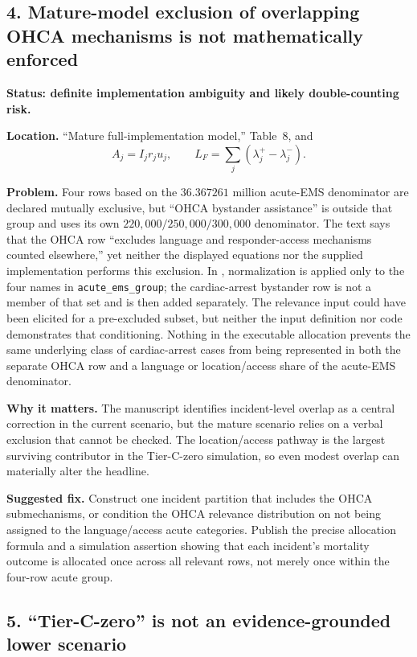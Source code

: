 \documentclass[11pt]{article}
\begin{document}
\subsection*{4. Mature-model exclusion of overlapping OHCA mechanisms is not
mathematically enforced}

\textbf{Status: definite implementation ambiguity and likely double-counting
risk.}

\textbf{Location.} ``Mature full-implementation model,'' Table~8, and
\[
A_j=I_jr_ju_j,\qquad
L_F=\sum_j(\lambda_j^+-\lambda_j^-).
\]

\textbf{Problem.} Four rows based on the $36.367261$ million acute-EMS
denominator are declared mutually exclusive, but ``OHCA bystander assistance''
is outside that group and uses its own $220{,}000/250{,}000/300{,}000$
denominator.  The text says that the OHCA row ``excludes language and
responder-access mechanisms counted elsewhere,'' yet neither the displayed
equations nor the supplied implementation performs this exclusion.  In
, normalization is applied only to the
four names in \texttt{acute\_ems\_group}; the cardiac-arrest bystander row is
not a member of that set and is then added separately.  The relevance input
could have been elicited for a pre-excluded subset, but neither the input
definition nor code demonstrates that conditioning.  Nothing in the executable
allocation prevents the same underlying class of cardiac-arrest cases from
being represented in both the separate OHCA row and a language or
location/access share of the acute-EMS denominator.

\textbf{Why it matters.} The manuscript identifies incident-level overlap as a
central correction in the current scenario, but the mature scenario relies on
a verbal exclusion that cannot be checked.  The location/access pathway is the
largest surviving contributor in the Tier-C-zero simulation, so even modest
overlap can materially alter the headline.

\textbf{Suggested fix.} Construct one incident partition that includes the OHCA
submechanisms, or condition the OHCA relevance distribution on not being
assigned to the language/access acute categories.  Publish the precise
allocation formula and a simulation assertion showing that each incident's
mortality outcome is allocated once across all relevant rows, not merely once
within the four-row acute group.

\subsection*{5. ``Tier-C-zero'' is not an evidence-grounded lower scenario}
\end{document}
